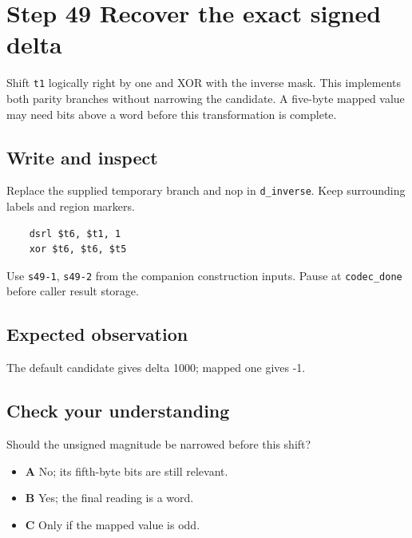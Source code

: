 \section{Step 49 Recover the exact signed delta}\label{delta-s49}

Shift \texttt{t1} logically right by one and XOR with the inverse mask. This implements both parity branches without narrowing the candidate. A five-byte mapped value may need bits above a word before this transformation is complete.

\subsection{Write and inspect}
Replace the supplied temporary branch and nop in \texttt{d\_inverse}. Keep surrounding labels and region markers.

\begin{verbatim}
    dsrl $t6, $t1, 1
    xor $t6, $t6, $t5
\end{verbatim}
Use \texttt{s49-1}, \texttt{s49-2} from the companion construction inputs. Pause at \texttt{codec\_done} before caller result storage.

\subsection{Expected observation}
The default candidate gives delta 1000; mapped one gives -1.

\subsection{Check your understanding}
Should the unsigned magnitude be narrowed before this shift?

\begin{itemize}
  \item \textbf{A} No; its fifth-byte bits are still relevant.
  \item \textbf{B} Yes; the final reading is a word.
  \item \textbf{C} Only if the mapped value is odd.
\end{itemize}
